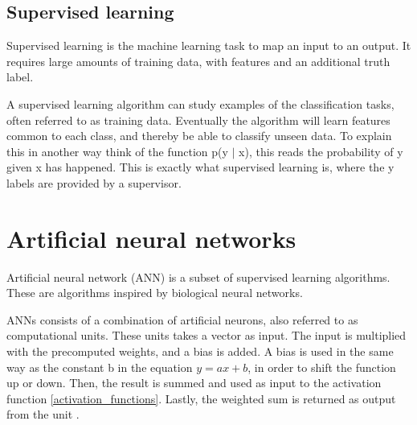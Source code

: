 \subsection{Supervised learning}
\label{supervised_learning}

Supervised learning is the machine learning task to map an input to an output. It requires large amounts of training data, with features and an additional truth label.

A supervised learning algorithm can study examples of the classification tasks, often referred to as training data. Eventually the algorithm will learn features common to each class, and thereby be able to classify unseen data. To explain this in another way think of the function p(y $|$ x), this reads the probability of y given x has happened. This is exactly what supervised learning is, where the y labels are provided by a supervisor.

\section{Artificial neural networks}
\label{artificial_neural_networks}

Artificial neural network (ANN) is a subset of supervised learning algorithms. These are algorithms inspired by biological neural networks.

ANNs consists of a combination of artificial neurons, also referred to as computational units. These units takes a vector as input. The input is multiplied with the precomputed weights, and a bias is added. A bias is used in the same way as the constant b in the equation $y = ax + b$, in order to shift the function up or down. Then, the result is summed and used as input to the activation function \ref{activation_functions}. Lastly, the weighted sum is returned as output from the unit \cite{_cs231n_????} \cite{_multi-layer_????}.

